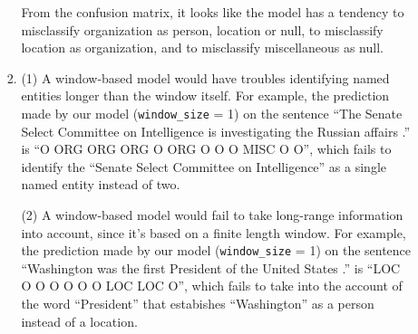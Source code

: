 \documentclass[10pt,reqno]{amsart}
\begin{document}
\begin{enumerate}[topsep=0pt,itemsep=3ex,partopsep=1ex,parsep=1ex]
\begin{enumerate}[itemsep=2ex]
\begin{enumerate}[itemsep=2ex]
\begin{center}
\begin{tabular}{c|c|c|c|c|c}
          \end{tabular}
        \end{center}
        \vspace{1mm}
        From the confusion matrix, it looks like the model has a tendency to misclassify 
        organization as person, location or null, to misclassify location as organization,
        and to misclassify miscellaneous as null.
      \item
        (1) A window-based model would have troubles identifying named entities longer than
        the window itself. For example, the prediction made by our model 
        (\texttt{window\_size} = 1) on the sentence 
        ``The Senate Select Committee on Intelligence is investigating the Russian affairs .'' 
        is 
        ``O   ORG    ORG    ORG       O  ORG          O  O             O   MISC    O       O'', 
        which fails to identify the ``Senate Select Committee on Intelligence'' as a single 
        named entity instead of two. 

        (2) A window-based model would fail to take long-range information into account, since 
        it's based on a finite length window. For example, the prediction made by 
        our model (\texttt{window\_size} = 1) on the sentence 
        ``Washington was the first President of the United States .''
        is
        ``LOC        O   O   O     O         O  O   LOC    LOC    O'',
        which fails to take into the account of the word ``President'' that estabishes 
        ``Washington'' as a person instead of a location. 
    \end{enumerate}
  \end{enumerate}



\end{enumerate}
\end{document}
